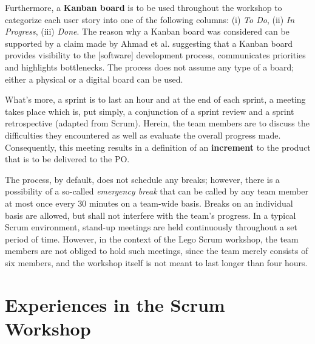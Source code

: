 \documentclass[conference]{IEEEtran}
\begin{document}
Furthermore, a \textbf{Kanban board} is to be used throughout the workshop to
categorize each user story into one of the following columns: (i) \textit{To
Do}, (ii) \textit{In Progress}, (iii) \textit{Done}. The reason why a Kanban
board was considered can be supported by a claim made by Ahmad et al.
\cite{Ahmad2014} suggesting that a Kanban board provides visibility to the
[software] development process, communicates priorities and highlights
bottlenecks. The process does not assume any type of a board; either a physical
or a digital board can be used.

What's more, a sprint is to last an hour and at the end of each sprint, a
meeting takes place which is, put simply, a conjunction of a sprint review and
a sprint retrospective (adapted from Scrum). Herein, the team members are to
discuss the difficulties they encountered as well as evaluate the overall
progress made. Consequently, this meeting results in a definition of an
\textbf{increment} to the product that is to be delivered to the PO.

The process, by default, does not schedule any breaks; however, there is a
possibility of a so-called \textit{emergency break} that can be called by any
team member at most once every 30 minutes on a team-wide basis.
Breaks on an individual basis are allowed, but shall not interfere with the
team's progress. In a typical Scrum environment, stand-up meetings are held
continuously throughout a set period of time. However, in the context of the
Lego Scrum workshop, the team members are not obliged to hold such meetings,
since the team merely consists of six members, and the workshop itself is not
meant to last longer than four hours.


\section{Experiences in the Scrum Workshop}
\label{sec:experiences}

\end{document}
